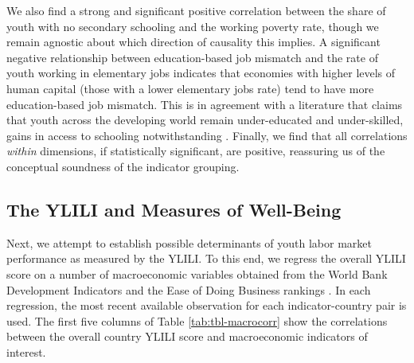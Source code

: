 \documentclass[
  a4paper, twoside, 12pt]{book}
\begin{document}
We also find a strong and significant positive correlation between the share of youth with no secondary schooling and the working poverty rate, though we remain agnostic about which direction of causality this implies. A significant negative relationship between education-based job mismatch and the rate of youth working in elementary jobs indicates that economies with higher levels of human capital (those with a lower elementary jobs rate) tend to have more education-based job mismatch. This is in agreement with a literature that claims that youth across the developing world remain under-educated and under-skilled, gains in access to schooling notwithstanding \autocite{morsy2020}. Finally, we find that all correlations \emph{within} dimensions, if statistically significant, are positive, reassuring us of the conceptual soundness of the indicator grouping.

\hypertarget{the-ylili-and-measures-of-well-being}{%
\subsection{The YLILI and Measures of Well-Being}\label{the-ylili-and-measures-of-well-being}}

Next, we attempt to establish possible determinants of youth labor market performance as measured by the YLILI. To this end, we regress the overall YLILI score on a number of macroeconomic variables obtained from the World Bank Development Indicators \autocite{worldbank2021b} and the Ease of Doing Business rankings \autocite{worldbank2021a}. In each regression, the most recent available observation for each indicator-country pair is used. The first five columns of Table \ref{tab:tbl-macrocorr} show the correlations between the overall country YLILI score and macroeconomic indicators of interest.
\end{document}
